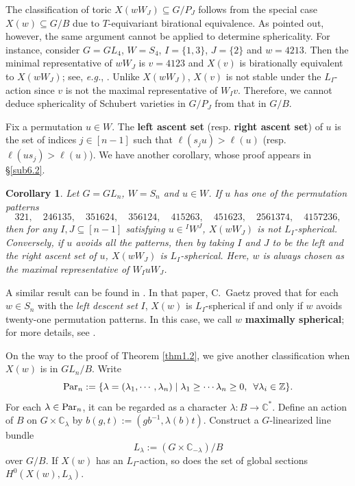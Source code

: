 \documentclass[12pt]{amsart}
\newtheorem{corollary}[theorem]{Corollary}
\theoremstyle{definition}
\theoremstyle{remark}
\newcommand{\C}{\mathbb{C}}
\newcommand{\Z}{\mathbb{Z}}
\newcommand{\Parn}{{\rm Par}_n}
\begin{document}
The classification of toric $X(wW_J) \subseteq G/P_J$ follows from the special case $X(w) \subseteq G/B$ due to $T$-equivariant birational equivalence. As \cite[Section 4.3]{gao2024orbitstructurescomplexityschubert} pointed out, however, the same argument cannot be applied to determine sphericality. For instance, consider $G = GL_4$, $W = S_4$, $I = \{1,3\}$, $J = \{2\}$ and $w = 4213$. Then the minimal representative of $wW_J$ is $v = 4123$ and $X(v)$ is birationally equivalent to $X(wW_J)$; see, \textit{e.g.}, \cite[Section 1.2]{MR2143072}. Unlike $X(wW_J)$, $X(v)$ is not stable under the $L_I$-action since $v$ is not the maximal representative of $W_I v$. Therefore, we cannot deduce sphericality of Schubert varieties in $G/P_J$ from that in $G/B$.

Fix a permutation $u \in W$. The \textbf{left ascent set} (resp. \textbf{right ascent set}) of $u$ is the set of indices $j \in [n-1]$ such that $\ell (s_j u) > \ell (u)$ (resp. $\ell (u s_j ) > \ell (u)$). We have another corollary, whose proof appears in \S \ref{sub6.2}.

\begin{corollary}\label{coro1.4}
Let $G = GL_n$, $W = S_n$ and $u \in W$. If $u$ has one of the permutation patterns
\begin{equation}\label{eqn1.12}
321, \quad 246135, \quad 351624, \quad 356124, \quad 415263, \quad 451623, \quad 2561374, \quad 4157236,
\end{equation}
then for any $I, J \subseteq [n-1]$ satisfying $u \in {}^I W^J$, $X(wW_J)$ is not $L_I$-spherical. Conversely, if $u$ avoids all the patterns, then by taking $I$ and $J$ to be the left and the right ascent set of $u$, $X(wW_J)$ is $L_I$-spherical. Here, $w$ is always chosen as the maximal representative of $W_I u W_J$.
\end{corollary}

A similar result can be found in \cite[Theorem 1.4]{MR4376215}. In that paper, C.~Gaetz proved that for each $w \in S_n$ with the \textit{left descent set} $I$, $X(w)$ is $L_I$-spherical if and only if $w$ avoids twenty-one permutation patterns. In this case, we call $w$ \textbf{maximally spherical}; for more details, see \cite[\S 3]{MR4394321}.

On the way to the proof of Theorem \ref{thm1.2}, we give another classification when $X(w)$ is in $GL_n/B$. Write
\begin{equation}\label{eqn1.3}
\Parn := \{ \lambda = (\lambda_1 , \cdots , \lambda_n) \mid \lambda_1 \geq \cdots \lambda_n \geq 0, \hspace{0.5em} \forall \lambda_i \in \Z\}.
\end{equation}
For each $\lambda \in \Parn$, it can be regarded as a character $\lambda : B \rightarrow \C^*$. Define an action of $B$ on $G \times \C_\lambda$ by $b(g,t):= (gb^{-1}, \lambda(b)t)$. Construct a $G$-linearized line bundle
\begin{equation}\label{eqn1.4}
L_\lambda := (G\times \C_{-\lambda}) / B
\end{equation}
over $G/B$. If $X(w)$ has an $L_I$-action, so does the set of global sections $H^0(X(w),L_\lambda)$.
\end{document}
